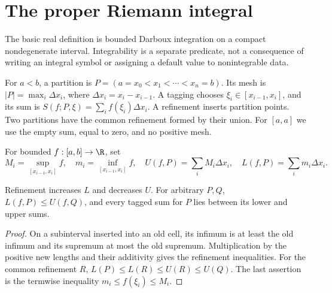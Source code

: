 \chapter{The proper Riemann integral}
The basic real definition is bounded Darboux integration on a compact
nondegenerate interval. Integrability is a separate predicate, not a consequence
of writing an integral symbol or assigning a default value to nonintegrable data.

\begin{definition}
For $a<b$, a partition is $P=(a=x_0<x_1<\cdots<x_n=b)$.
Its mesh is $|P|=\max_i\Delta x_i$, where $\Delta x_i=x_i-x_{i-1}$.
A tagging chooses $\xi_i\in[x_{i-1},x_i]$, and its sum is
$S(f;P,\xi)=\sum_i f(\xi_i)\Delta x_i$. A refinement inserts partition
points. Two partitions have the common refinement formed by their union.
For $[a,a]$ we use the empty sum, equal to zero, and no positive mesh.
\end{definition}

\begin{definition}
For bounded $f:[a,b]\to\R$, set
\[M_i=\sup_{[x_{i-1},x_i]}f,\quad m_i=\inf_{[x_{i-1},x_i]}f,\quad
 U(f,P)=\sum_iM_i\Delta x_i,\quad L(f,P)=\sum_im_i\Delta x_i.
\]
\end{definition}
\begin{lemma}
Refinement increases $L$ and decreases $U$. For arbitrary $P,Q$,
$L(f,P)\le U(f,Q)$, and every tagged sum for $P$ lies between its
lower and upper sums.
\end{lemma}
\begin{proof}
On a subinterval inserted into an old cell, its infimum is at least the old
infimum and its supremum at most the old supremum. Multiplication by the
positive new lengths and their additivity gives the refinement inequalities.
For the common refinement $R$, $L(P)\le L(R)\le U(R)\le U(Q)$.
The last assertion is the termwise inequality $m_i\le f(\xi_i)\le M_i$.
\end{proof}


